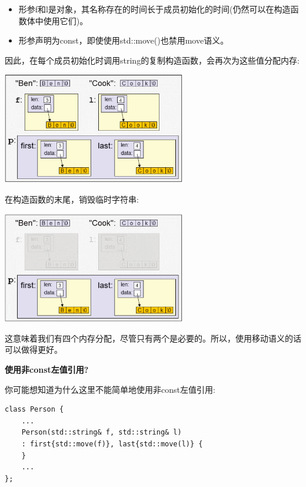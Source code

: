 \begin{itemize}
	\item 形参f和l是对象，其名称存在的时间长于成员初始化的时间(仍然可以在构造函数体中使用它们)。
	\item 形参声明为const，即使使用std::move()也禁用move语义。
\end{itemize}

因此，在每个成员初始化时调用string的复制构造函数，会再次为这些值分配内存:\par

\begin{center}
	\includegraphics[width=0.6\textwidth]{content/1/chapter4/images/2}
\end{center}

在构造函数的末尾，销毁临时字符串:\par

\begin{center}
	\includegraphics[width=0.6\textwidth]{content/1/chapter4/images/3}
\end{center}

这意味着我们有四个内存分配，尽管只有两个是必要的。所以，使用移动语义的话可以做得更好。\par

\hspace*{\fill} \par %
\textbf{使用非const左值引用?}

你可能想知道为什么这里不能简单地使用非const左值引用:\par

\begin{lstlisting}[caption={}]
class Person {
	...
	Person(std::string& f, std::string& l)
	: first{std::move(f)}, last{std::move(l)} {
	}
	...
};
\end{lstlisting}

